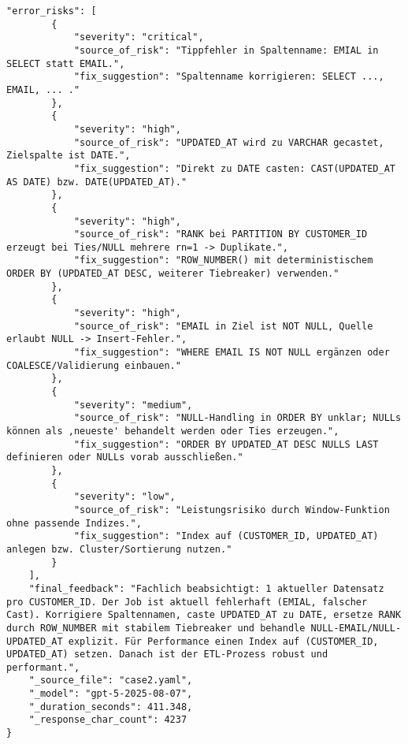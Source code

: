 \begin{lstlisting}[caption={Ausgabe: GPT-5 Anwendungsfall 2 Konsistenzdurchlauf},label={gpt_case2_prompt2}]
    "error_risks": [
        {
            "severity": "critical",
            "source_of_risk": "Tippfehler in Spaltenname: EMIAL in SELECT statt EMAIL.",
            "fix_suggestion": "Spaltenname korrigieren: SELECT ..., EMAIL, ... ."
        },
        {
            "severity": "high",
            "source_of_risk": "UPDATED_AT wird zu VARCHAR gecastet, Zielspalte ist DATE.",
            "fix_suggestion": "Direkt zu DATE casten: CAST(UPDATED_AT AS DATE) bzw. DATE(UPDATED_AT)."
        },
        {
            "severity": "high",
            "source_of_risk": "RANK bei PARTITION BY CUSTOMER_ID erzeugt bei Ties/NULL mehrere rn=1 -> Duplikate.",
            "fix_suggestion": "ROW_NUMBER() mit deterministischem ORDER BY (UPDATED_AT DESC, weiterer Tiebreaker) verwenden."
        },
        {
            "severity": "high",
            "source_of_risk": "EMAIL in Ziel ist NOT NULL, Quelle erlaubt NULL -> Insert-Fehler.",
            "fix_suggestion": "WHERE EMAIL IS NOT NULL ergänzen oder COALESCE/Validierung einbauen."
        },
        {
            "severity": "medium",
            "source_of_risk": "NULL-Handling in ORDER BY unklar; NULLs können als ,neueste' behandelt werden oder Ties erzeugen.",
            "fix_suggestion": "ORDER BY UPDATED_AT DESC NULLS LAST definieren oder NULLs vorab ausschließen."
        },
        {
            "severity": "low",
            "source_of_risk": "Leistungsrisiko durch Window-Funktion ohne passende Indizes.",
            "fix_suggestion": "Index auf (CUSTOMER_ID, UPDATED_AT) anlegen bzw. Cluster/Sortierung nutzen."
        }
    ],
    "final_feedback": "Fachlich beabsichtigt: 1 aktueller Datensatz pro CUSTOMER_ID. Der Job ist aktuell fehlerhaft (EMIAL, falscher Cast). Korrigiere Spaltennamen, caste UPDATED_AT zu DATE, ersetze RANK durch ROW_NUMBER mit stabilem Tiebreaker und behandle NULL-EMAIL/NULL-UPDATED_AT explizit. Für Performance einen Index auf (CUSTOMER_ID, UPDATED_AT) setzen. Danach ist der ETL-Prozess robust und performant.",
    "_source_file": "case2.yaml",
    "_model": "gpt-5-2025-08-07",
    "_duration_seconds": 411.348,
    "_response_char_count": 4237
}
\end{lstlisting}

